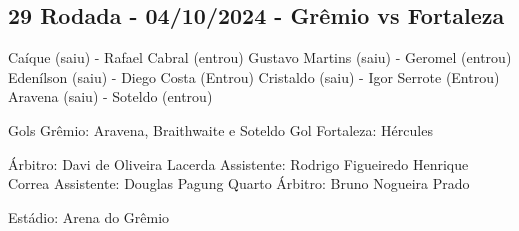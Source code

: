 \newpage
\subsection{29 Rodada - 04/10/2024 - Grêmio vs Fortaleza}

\begin{figure}[H]
    \centering
    
\end{figure}


Caíque (saiu) - Rafael Cabral (entrou)
Gustavo Martins (saiu) - Geromel (entrou)
Edenílson (saiu) - Diego Costa (Entrou)
Cristaldo (saiu) - Igor Serrote (Entrou)
Aravena (saiu) - Soteldo (entrou)

Gols Grêmio: Aravena, Braithwaite e Soteldo
Gol Fortaleza: Hércules

Árbitro: Davi de Oliveira Lacerda
Assistente: Rodrigo Figueiredo Henrique Correa
Assistente: Douglas Pagung
Quarto Árbitro: Bruno Nogueira Prado

Estádio: Arena do Grêmio
